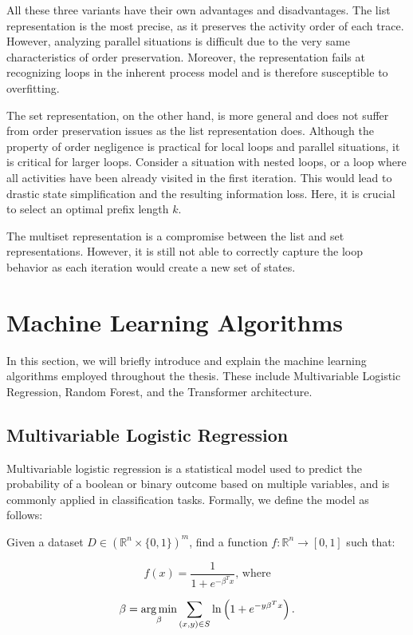 All these three variants have their own advantages and disadvantages. The list representation is the most precise, as it preserves the activity order of each trace. However, analyzing parallel situations is difficult due to the very same characteristics of order preservation. Moreover, the representation fails at recognizing loops in the inherent process model and is therefore susceptible to overfitting.

The set representation, on the other hand, is more general and does not suffer from order preservation issues as the list representation does. Although the property of order negligence is practical for local loops and parallel situations, it is critical for larger loops. Consider a situation with nested loops, or a loop where all activities have been already visited in the first iteration. This would lead to drastic state simplification and the resulting information loss. Here, it is crucial to select an optimal prefix length $k$.
 
The multiset representation is a compromise between the list and set representations. However, it is still not able to correctly capture the loop behavior as each iteration would create a new set of states.

\section{Machine Learning Algorithms}

In this section, we will briefly introduce and explain the machine learning algorithms employed throughout the thesis. These include Multivariable Logistic Regression, Random Forest, and the Transformer architecture.

\subsection{Multivariable Logistic Regression}

Multivariable logistic regression is a statistical model used to predict the probability of a boolean or binary outcome based on multiple variables, and is commonly applied in classification tasks. Formally, we define the model as follows:

\begin{definition}
    Given a dataset $D \in (\mathbb{R}^n \times \{0, 1\})^m$, find a function $f: \mathbb{R}^n \rightarrow [0, 1]$ such that:

    \[
        f(x) = \frac{1}{1 + e^{-\beta^T x}} \text{, where}
    \]


    \[
        \beta = \operatorname*{arg\,min}_{\beta} \sum_{(x, y) \in S} \ln \left( 1  + e^{-y \beta^T x} \right).
    \]
\end{definition}

